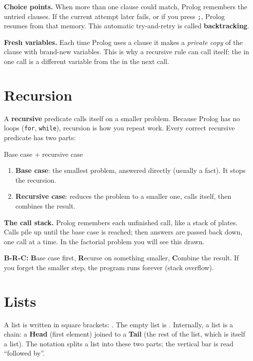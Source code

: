 \documentclass[11pt,a4paper]{article}
\newcommand{\pred}[1]{\texttt{\detokenize{#1}}}
\begin{document}
\textbf{Choice points.} When more than one clause could match, Prolog remembers the untried clauses. If the current attempt later fails, or if you press \texttt{;}, Prolog resumes from that memory. This automatic try-and-retry is called \textbf{backtracking}.

\textbf{Fresh variables.} Each time Prolog uses a clause it makes a \emph{private copy} of the clause with brand-new variables. This is why a recursive rule can call itself: the \pred{N} in one call is a different variable from the \pred{N} in the next call.

\section{Recursion}

A \textbf{recursive} predicate calls itself on a smaller problem. Because Prolog has no loops (\texttt{for}, \texttt{while}), recursion is how you repeat work. Every correct recursive predicate has two parts:

\begin{patternbox}{Base case + recursive case}
\begin{enumerate}[leftmargin=*]
  \item \textbf{Base case}: the smallest problem, answered directly (usually a fact). It stops the recursion.
  \item \textbf{Recursive case}: reduces the problem to a smaller one, calls itself, then combines the result.
\end{enumerate}
\end{patternbox}

\textbf{The call stack.} Prolog remembers each unfinished call, like a stack of plates. Calls pile up until the base case is reached; then answers are passed back down, one call at a time. In the factorial problem you will see this drawn.

\begin{mnbox}
\textbf{B-R-C:} \textbf{B}ase case first, \textbf{R}ecurse on something smaller, \textbf{C}ombine the result. If you forget the smaller step, the program runs forever (stack overflow).
\end{mnbox}

\section{Lists}\label{sec:lists}

A list is written in square brackets: \pred{[a,b,c]}. The empty list is \pred{[]}. Internally, a list is a chain: a \textbf{Head} (first element) joined to a \textbf{Tail} (the rest of the list, which is itself a list). The notation \pred{[H|T]} splits a list into these two parts; the vertical bar \pred{|} is read ``followed by''.
\end{document}
